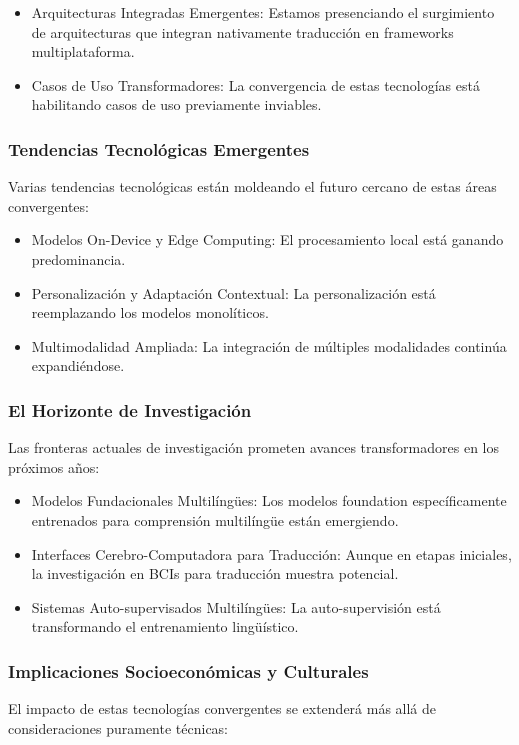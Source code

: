 \begin{itemize}
    \item Arquitecturas Integradas Emergentes: Estamos presenciando el surgimiento de arquitecturas que integran nativamente traducción en frameworks multiplataforma.
    \item Casos de Uso Transformadores: La convergencia de estas tecnologías está habilitando casos de uso previamente inviables.
\end{itemize}

\subsubsection{Tendencias Tecnológicas Emergentes}
Varias tendencias tecnológicas están moldeando el futuro cercano de estas áreas convergentes:

\begin{itemize}
    \item Modelos On-Device y Edge Computing: El procesamiento local está ganando predominancia.
    \item Personalización y Adaptación Contextual: La personalización está reemplazando los modelos monolíticos.
    \item Multimodalidad Ampliada: La integración de múltiples modalidades continúa expandiéndose.
\end{itemize}

\subsubsection{El Horizonte de Investigación}
Las fronteras actuales de investigación prometen avances transformadores en los próximos años:

\begin{itemize}
    \item Modelos Fundacionales Multilíngües: Los modelos foundation específicamente entrenados para comprensión multilíngüe están emergiendo.
    \item Interfaces Cerebro-Computadora para Traducción: Aunque en etapas iniciales, la investigación en BCIs para traducción muestra potencial.
    \item Sistemas Auto-supervisados Multilíngües: La auto-supervisión está transformando el entrenamiento lingüístico.
\end{itemize}

\subsubsection{Implicaciones Socioeconómicas y Culturales}
El impacto de estas tecnologías convergentes se extenderá más allá de consideraciones puramente técnicas:

